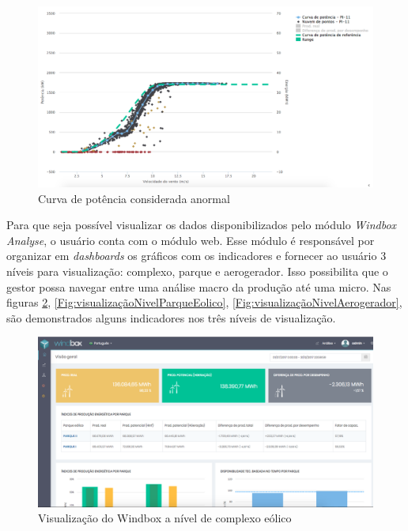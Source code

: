 \begin{figure}[htbp!] \begin{center}
\includegraphics[width=1\linewidth]{./figuras/curva-potencia-problema}
\caption{Curva de potência considerada anormal}
\label{Fig:curvaPotenciaProblema}
\end{center} 
\end{figure}

Para que seja possível visualizar os dados disponibilizados pelo módulo \textit{Windbox Analyse}, o usuário conta com o módulo web. Esse módulo é responsável por organizar em \textit{dashboards} os gráficos com os indicadores e fornecer ao usuário 3 níveis para visualização: complexo, parque e aerogerador. Isso possibilita que o gestor possa navegar entre uma análise macro da produção até uma micro. Nas figuras \ref{Fig:visualizaçãoNivelComplexoEolico}, \ref{Fig:visualizaçãoNivelParqueEolico}, \ref{Fig:visualizaçãoNivelAerogerador}, são demonstrados alguns indicadores nos três níveis de visualização.

\begin{figure}[htbp!] \begin{center}
\includegraphics[width=1\linewidth]{./figuras/tela-complexo}
\caption{Visualização do Windbox a nível de complexo eólico}
\label{Fig:visualizaçãoNivelComplexoEolico}
\end{center} 
\end{figure}

